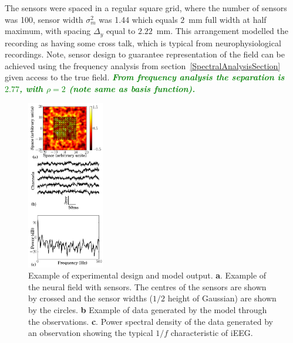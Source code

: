 \documentclass[twocolumn,11pt,a4paper]{article}		%
\newcommand{\omg}[1]{\textsf{\emph{\textbf{\textcolor{green}{#1}}}}}
\begin{document}
The sensors were spaced in a regular square grid, where the number of sensors was 100, sensor width $\sigma^2_m$ was 1.44 which equals $2$~mm full width at half maximum, with spacing $\Delta_y$ equal to $2.22$~mm. This arrangement modelled the recording as having some cross talk, which is typical from neurophysiological recordings. Note, sensor design to guarantee representation of the field can be achieved using the frequency analysis from section~\ref{SpectralAnalysisSection} given access to the true field. \omg{From frequency analysis the separation is $2.77$, with $\rho = 2$ (note same as basis function).} 
   \begin{figure}\label{fig:experimental design}
   	\begin{center}
   		\includegraphics[width=0.3\textwidth]{./Graph/ExperimentFigurePy_1.pdf} 
   	\end{center}
   	\caption{Example of experimental design and model output. \textbf{a}. Example of the neural field with sensors. The centres of the sensors are shown by crossed and the sensor widths ($1/2$ height of Gaussian) are shown by the circles. \textbf{b} Example of data generated by the model through the observations. \textbf{c}. Power spectral density of the data generated by an observation showing the typical $1/f$ characteristic of iEEG.} 
   \end{figure}
\end{document}
